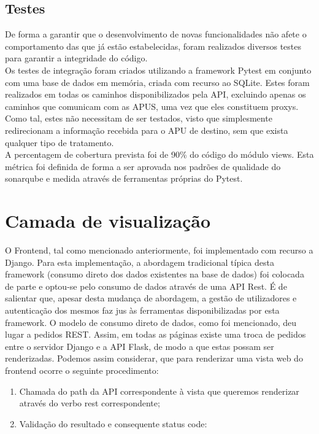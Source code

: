 \subsection{Testes}
De forma a garantir que o desenvolvimento de novas funcionalidades não afete o comportamento das que já estão estabelecidas, foram realizados diversos testes para garantir a integridade do código.\newline\\
Os testes de integração foram criados utilizando a framework Pytest em conjunto com uma base de dados em memória, criada com recurso ao SQLite. Estes foram realizados em todas os caminhos disponibilizados pela API, excluindo apenas os caminhos que comunicam com as APUS, uma vez que eles constituem proxys. Como tal, estes não necessitam de ser testados, visto que simplesmente redirecionam a informação recebida para o APU de destino, sem que exista qualquer tipo de tratamento.\newline\\
A percentagem de cobertura prevista foi de 90\% do código do módulo views. Esta métrica foi definida de forma a ser aprovada nos padrões de qualidade do sonarqube \cite{sonar} e medida através de ferramentas próprias do Pytest.

\section{Camada de visualização}
O Frontend, tal como mencionado anteriormente, foi implementado com recurso a Django. Para esta implementação, a abordagem tradicional típica desta framework (consumo direto dos dados existentes na base de dados) foi colocada de parte e optou-se pelo consumo de dados através de uma API Rest. É de salientar que, apesar desta mudança de abordagem, a gestão de utilizadores e autenticação dos mesmos faz jus às ferramentas disponibilizadas por esta framework.\newline
O modelo de consumo direto de dados, como foi mencionado, deu lugar a pedidos REST. Assim, em todas as páginas existe uma troca de pedidos entre o servidor Django e a API Flask, de modo a que estas possam ser renderizadas. Podemos assim considerar, que para renderizar uma vista web do frontend ocorre o seguinte procedimento:
\begin{enumerate}[noitemsep]
    \item Chamada do path da API correspondente à vista que queremos renderizar através do verbo rest correspondente;
    \item Validação do resultado e consequente status code:
\end{enumerate}

